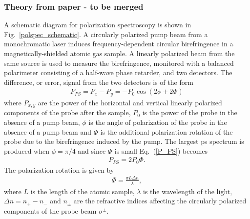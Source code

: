 \subsubsection{Theory from paper - to be merged}
A schematic diagram for polarization spectroscopy is shown in Fig.~\ref{polspec_schematic}.
A circularly polarized pump beam from a monochromatic laser induces frequency-dependent circular birefringence in a magnetically-shielded atomic gas sample.
A linearly polarized beam from the same source is used to measure the birefringence, monitored with a balanced polarimeter consisting of a half-wave phase retarder,  and two detectors.
The difference, or error, signal from the two detectors is of the form \cite{pearman_polarization_2002}
\begin{align}
P_{PS} = P_x-P_y = -P_0 \cos(2\phi+2\Phi)\label{P_PS}
\end{align}
where $P_{x,y}$ are the power of the horizontal and vertical linearly polarized components of the probe after the sample, $P_0$ is the power of the probe in the absence of a pump beam, $\phi$ is the angle of polarization of the probe in the absence of a pump beam and $\Phi$ is the additional polarization rotation of the probe due to the birefringence induced by the pump.
The largest \gls*{ps} spectrum is produced when $\phi=\pi/4$ and since $\Phi$ is small Eq.~(\ref{P_PS})  becomes
\begin{align}
P_{PS} = 2P_0 \Phi.
\end{align}
The polarization rotation is given by
\begin{align}
\Phi = \frac{\pi L \Delta n}{\lambda},
\end{align}
where $L$ is the length of the atomic sample, $\lambda$ is the wavelength of the light, $\Delta n = n_+ - n_-$ and $n_\pm$ are the refractive indices affecting the circularly polarized components of the probe beam $\sigma^\pm$.
